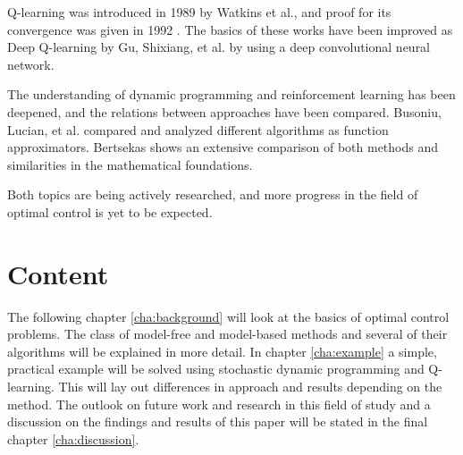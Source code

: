 Q-learning \cite{watkins1989learning} was introduced in 1989 by Watkins et al., and proof for its convergence was given in 1992 \cite{watkins1992q}. The basics of these works have been improved as Deep Q-learning by Gu, Shixiang, et al. \cite{gu2016continuous} by using a deep convolutional neural network.

The understanding of dynamic programming and reinforcement learning has been deepened, and the relations between approaches have been compared. Busoniu, Lucian, et al. \cite{busoniu2017reinforcement} compared and analyzed different algorithms as function approximators. Bertsekas \cite{bertsekas2019reinforcement} shows an extensive comparison of both methods and similarities in the mathematical foundations.

Both topics are being actively researched, and more progress in the field of optimal control is yet to be expected.

\section{Content}
\label{sec:content}
The following chapter \ref{cha:background} will look at the basics of optimal control problems. The class of model-free and model-based methods and several of their algorithms will be explained in more detail. In chapter \ref{cha:example} a simple, practical example will be solved using stochastic dynamic programming and Q-learning. This will lay out differences in approach and results depending on the method. The outlook on future work and research in this field of study and a discussion on the findings and results of this paper will be stated in the final chapter \ref{cha:discussion}.